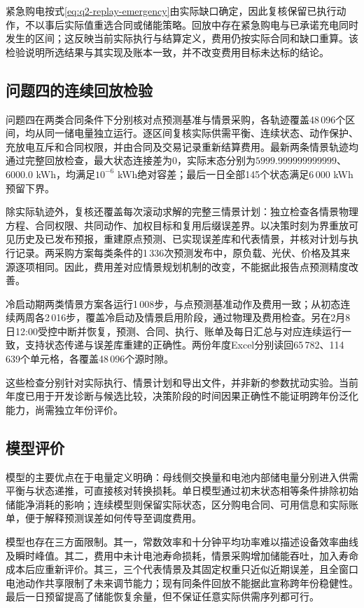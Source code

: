 紧急购电按式\eqref{eq:q2-replay-emergency}由实际缺口确定，因此复核保留已执行动作，不以事后实际值重选合同或储能策略。回放中存在紧急购电与已承诺充电同时发生的区间；这反映当前实际执行与结算定义，费用仍按实际合同和缺口重算。该检验说明所选结果与其实现及账本一致，并不改变费用目标未达标的结论。

\subsection{问题四的连续回放检验}
问题四在两类合同条件下分别核对点预测基准与情景采购，各轨迹覆盖48\,096个区间，均从同一储电量独立运行。逐区间复核实际供需平衡、连续状态、动作保护、充放电互斥和合同权限，并由合同及交易记录重新结算费用。最新两条情景轨迹均通过完整回放检查，最大状态连接差为0，实际末态分别为$5999.999999999999$、$6000.0$ kWh，均满足$10^{-6}$ kWh绝对容差；最后一日全部145个状态满足6\,000 kWh预留下界。

除实际轨迹外，复核还覆盖每次滚动求解的完整三情景计划：独立检查各情景物理方程、合同权限、共同动作、加权目标和复用后缀误差界。以决策时刻为界重放可见历史及已发布预报，重建原点预测、已实现误差库和代表情景，并核对计划与执行记录。两采购方案每类条件的1\,336次预测发布中，原负载、光伏、价格及其来源逐项相同。因此，费用差对应情景规划机制的改变，不能据此报告点预测精度改善。

冷启动期两类情景方案各运行1\,008步，与点预测基准动作及费用一致；从初态连续两周各2\,016步，覆盖冷启动及情景启用阶段，通过物理及费用检查。另在2月8日12:00受控中断并恢复，预测、合同、执行、账单及每日汇总与对应连续运行一致，支持状态传递与误差库重建的正确性。两份年度Excel分别读回65\,782、114\,639个单元格，各覆盖48\,096个源时隙。

这些检查分别针对实际执行、情景计划和导出文件，并非新的参数扰动实验。当前年度已用于开发诊断与候选比较，决策阶段的时间因果正确性不能证明跨年份泛化能力，尚需独立年份评价。

\subsection{模型评价}
模型的主要优点在于电量定义明确：母线侧交换量和电池内部储电量分别进入供需平衡与状态递推，可直接核对转换损耗。单日模型通过初末状态相等条件排除初始储能净消耗的影响；连续模型则保留实际状态，区分购电合同、可用信息和实际账单，便于解释预测误差如何传导至调度费用。

模型也存在三方面限制。其一，常数效率和十分钟平均功率难以描述设备效率曲线及瞬时峰值。其二，费用中未计电池寿命损耗，情景采购增加储能吞吐，加入寿命成本后应重新评价。其三，三个代表情景及其固定权重只近似近期误差，且全窗口电池动作共享限制了未来调节能力；现有同条件回放不能据此宣称跨年份稳健性。最后一日预留提高了储能恢复余量，但不保证任意实际供需序列都可行。
\FloatBarrier
